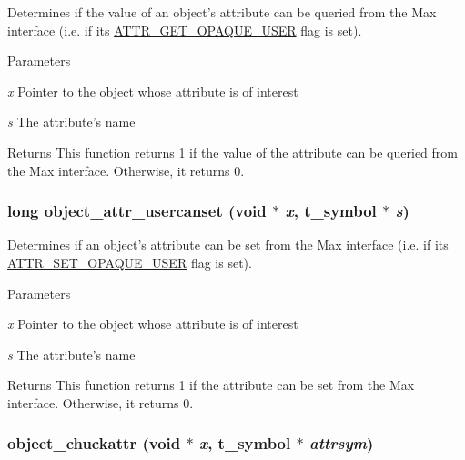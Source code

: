 Determines if the value of an object's attribute can be queried from the Max interface (i.e. if its \hyperlink{group__attr_ggaf296cfc6741bb19207f6ed8062809115a1b88cd18f871ecd713f291b3ec4bc464}{ATTR\_\-GET\_\-OPAQUE\_\-USER} flag is set).


\begin{DoxyParams}{Parameters}
\item[{\em x}]Pointer to the object whose attribute is of interest \item[{\em s}]The attribute's name\end{DoxyParams}
\begin{DoxyReturn}{Returns}
This function returns 1 if the value of the attribute can be queried from the Max interface. Otherwise, it returns 0. 
\end{DoxyReturn}
\hypertarget{group__attr_gac37ffb3ff9cfe4840c351ce2387c5f9e}{
\subsubsection[{object\_\-attr\_\-usercanset}]{\setlength{\rightskip}{0pt plus 5cm}long object\_\-attr\_\-usercanset (void $\ast$ {\em x}, \/  {\bf t\_\-symbol} $\ast$ {\em s})}}
\label{group__attr_gac37ffb3ff9cfe4840c351ce2387c5f9e}


Determines if an object's attribute can be set from the Max interface (i.e. if its \hyperlink{group__attr_ggaf296cfc6741bb19207f6ed8062809115a82e9ec2c8a764eaa9f1fed1bcf611318}{ATTR\_\-SET\_\-OPAQUE\_\-USER} flag is set).


\begin{DoxyParams}{Parameters}
\item[{\em x}]Pointer to the object whose attribute is of interest \item[{\em s}]The attribute's name\end{DoxyParams}
\begin{DoxyReturn}{Returns}
This function returns 1 if the attribute can be set from the Max interface. Otherwise, it returns 0. 
\end{DoxyReturn}
\hypertarget{group__attr_gad1d2497a054fa297defd47d57aef216c}{
\subsubsection[{object\_\-chuckattr}]{ object\_\-chuckattr (void $\ast$ {\em x}, \/  {\bf t\_\-symbol} $\ast$ {\em attrsym})}}
\label{group__attr_gad1d2497a054fa297defd47d57aef216c}


